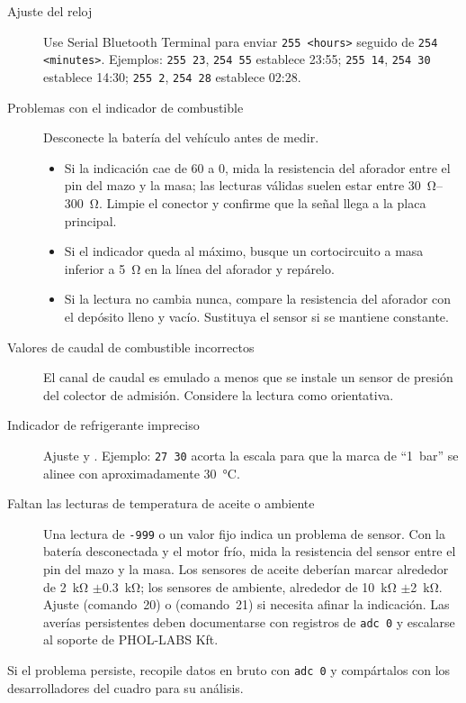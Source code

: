 \begin{description}
    \item[Ajuste del reloj] Use Serial Bluetooth Terminal para enviar \verb|255 <hours>| seguido de \verb|254 <minutes>|. Ejemplos: \verb|255 23|, \verb|254 55| establece 23:55; \verb|255 14|, \verb|254 30| establece 14:30; \verb|255 2|, \verb|254 28| establece 02:28.
    \item[Problemas con el indicador de combustible] Desconecte la batería del vehículo antes de medir.\begin{itemize}
        \item Si la indicación cae de 60 a 0, mida la resistencia del aforador entre el pin del mazo y la masa; las lecturas válidas suelen estar entre \SIrange{30}{300}{\ohm}. Limpie el conector y confirme que la señal llega a la placa principal.
        \item Si el indicador queda al máximo, busque un cortocircuito a masa inferior a \SI{5}{\ohm} en la línea del aforador y repárelo.
        \item Si la lectura no cambia nunca, compare la resistencia del aforador con el depósito lleno y vacío. Sustituya el sensor si se mantiene constante.
    \end{itemize}
    \item[Valores de caudal de combustible incorrectos] El canal de caudal es emulado a menos que se instale un sensor de presión del colector de admisión. Considere la lectura como orientativa.
    \item[Indicador de refrigerante impreciso] Ajuste  y . Ejemplo: \verb|27 30| acorta la escala para que la marca de ``1~bar'' se alinee con aproximadamente \SI{30}{\celsius}.
    \item[Faltan las lecturas de temperatura de aceite o ambiente] Una lectura de \texttt{-999} o un valor fijo indica un problema de sensor. Con la batería desconectada y el motor frío, mida la resistencia del sensor entre el pin del mazo y la masa. Los sensores de aceite deberían marcar alrededor de \SI{2}{\kilo\ohm} \ensuremath{\pm}\SI{0.3}{\kilo\ohm}; los sensores de ambiente, alrededor de \SI{10}{\kilo\ohm} \ensuremath{\pm}\SI{2}{\kilo\ohm}. Ajuste  (comando~20) o  (comando~21) si necesita afinar la indicación. Las averías persistentes deben documentarse con registros de \verb|adc 0| y escalarse al soporte de PHOL-LABS Kft.
\end{description}

Si el problema persiste, recopile datos en bruto con \verb|adc 0| y compártalos con los desarrolladores del cuadro para su análisis.

